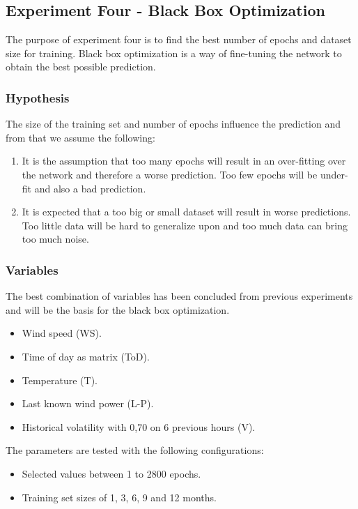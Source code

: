 \subsection{Experiment Four - Black Box Optimization}
\label{sec:experimentFourBlackBox}
The purpose of experiment four is to find the best number of epochs and dataset size for training. Black box optimization is a way of fine-tuning the network to obtain the best possible prediction.

\subsubsection{Hypothesis}
The size of the training set and number of epochs influence the prediction and from that we assume the following:
\begin{enumerate}
\item It is the assumption that too many epochs will result in an over-fitting over the network and therefore a worse prediction. Too few epochs will be under-fit and also a bad prediction.
\item It is expected that a too big or small dataset will result in worse predictions. Too little data will be hard to generalize upon and too much data can bring too much noise.
\end{enumerate}

\subsubsection{Variables}
The best combination of variables has been concluded from previous experiments and will be the basis for the black box optimization. 

\begin{itemize}
\item Wind speed (WS).
\item Time of day as matrix (ToD).
\item Temperature (T).
\item Last known wind power (L-P).
\item Historical volatility with 0,70 on 6 previous hours (V).
\end{itemize}

The parameters are tested with the following configurations:

\begin{itemize}
\item Selected values between 1 to 2800 epochs.
\item Training set sizes of 1, 3, 6, 9 and 12 months.
\end{itemize}

